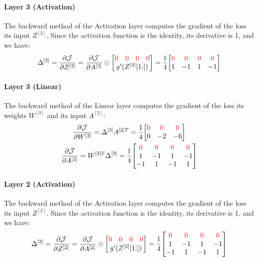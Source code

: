 \paragraph{Layer 3 (Activation)} The backward method of the Activation layer computes the gradient of the loss \wrt its input $Z^{[3]}$. Since the activation function is the identity, its derivative is 1, and we have:
\begin{equation*}
    \Delta^{[3]} = \pdv{\J}{Z^{[3]}} = \pdv{\J}{A^{[3]}} \odot \mqty[
        \mqty{\color{red} 0 & \color{red} 0 & \color{red} 0 & \color{red} 0} \\
        g'(Z^{[3]}[1\hspace{-0.6ex}:])
    ] = \frac{1}{4} \mqty[
        \color{red} 0 & \color{red} 0 & \color{red} 0 & \color{red} 0 \\
        1 & -1 & 1 & -1
    ]
\end{equation*}

\paragraph{Layer 3 (Linear)} The backward method of the Linear layer computes the gradient of the loss \wrt its weights $W^{[3]}$ and its input $A^{[2]}$:
\begin{gather*}
    \pdv{\J}{W^{[3]}} = \Delta^{[3]} A^{[2]T} = \frac{1}{4} \mqty[
        \color{red} 0 & \color{red} 0 & \color{red} 0 \\
        0 & -2 & -6
    ]\\
    \pdv{\J}{A^{[2]}} = W^{[3]T} \Delta^{[3]} = \frac{1}{4} \mqty[
        \color{red} 0 & \color{red} 0 & \color{red} 0 & \color{red} 0 \\
        1 & -1 & 1 & -1 \\
        -1 & 1 & -1 & 1
    ]
\end{gather*}

\paragraph{Layer 2 (Activation)} The backward method of the Activation layer computes the gradient of the loss \wrt its input $Z^{[2]}$. Since the activation function is the identity, its derivative is 1, and we have:
\begin{equation*}
    \Delta^{[2]} = \pdv{\J}{Z^{[2]}} = \pdv{\J}{A^{[2]}} \odot \mqty[
        \mqty{\color{red} 0 & \color{red} 0 & \color{red} 0 & \color{red} 0} \\
        g'(Z^{[2]}[1\hspace{-0.6ex}:])
    ] = \frac{1}{4} \mqty[
        \color{red} 0 & \color{red} 0 & \color{red} 0 & \color{red} 0 \\
        1 & -1 & 1 & -1 \\
        -1 & 1 & -1 & 1
    ]
\end{equation*}

